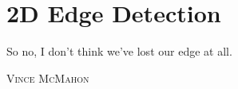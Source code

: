 \chapter{2D Edge Detection} 
\label{chap:2DEdgeDetection}

\epigraph{So no, I don't think we've lost our edge at all.}
{\textsc{Vince McMahon}}

\pagebreak




%